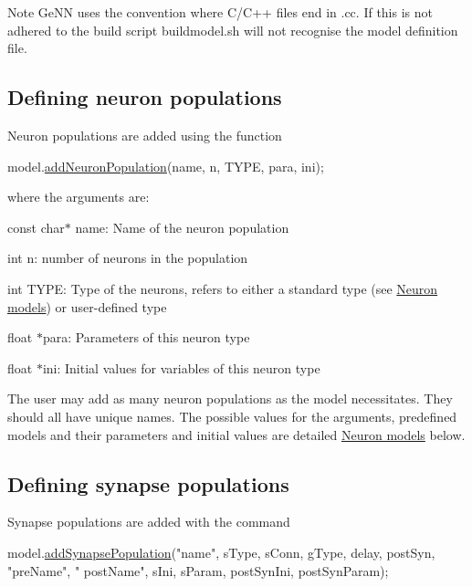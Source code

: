 \begin{DoxyNote}{Note}
Ge\+N\+N uses the convention where C/\+C++ files end in {\ttfamily .cc}. If this is not adhered to the build script {\ttfamily buildmodel.\+sh} will not recognise the model definition file.
\end{DoxyNote}
\hypertarget{sect1_subsect11}{}\subsection{Defining neuron populations}\label{sect1_subsect11}
Neuron populations are added using the function 
\begin{DoxyCode}
model.\hyperlink{classNNmodel_a24532739d3ae98da3e00a9fe5aadd54e}{addNeuronPopulation}(name, n, TYPE, para, ini);
\end{DoxyCode}
 where the arguments are\+: \begin{DoxyItemize}
\item {\ttfamily const} {\ttfamily char$\ast$} name\+: Name of the neuron population \item {\ttfamily int} n\+: number of neurons in the population \item {\ttfamily int} T\+Y\+P\+E\+: Type of the neurons, refers to either a standard type (see \hyperlink{sect2}{Neuron models}) or user-\/defined type \item {\ttfamily float} $\ast$para\+: Parameters of this neuron type \item {\ttfamily float} $\ast$ini\+: Initial values for variables of this neuron type\end{DoxyItemize}
The user may add as many neuron populations as the model necessitates. They should all have unique names. The possible values for the arguments, predefined models and their parameters and initial values are detailed \hyperlink{sect2}{Neuron models} below.\hypertarget{sect1_subsect12}{}\subsection{Defining synapse populations}\label{sect1_subsect12}
Synapse populations are added with the command 
\begin{DoxyCode}
model.\hyperlink{classNNmodel_a9dceb36a7d36c82adfdb5642df8f25f7}{addSynapsePopulation}(\textcolor{stringliteral}{"name"}, sType, sConn, gType, delay, postSyn, \textcolor{stringliteral}{"preName"}, \textcolor{stringliteral}{"
      postName"}, sIni, sParam, postSynIni, postSynParam);
\end{DoxyCode}
